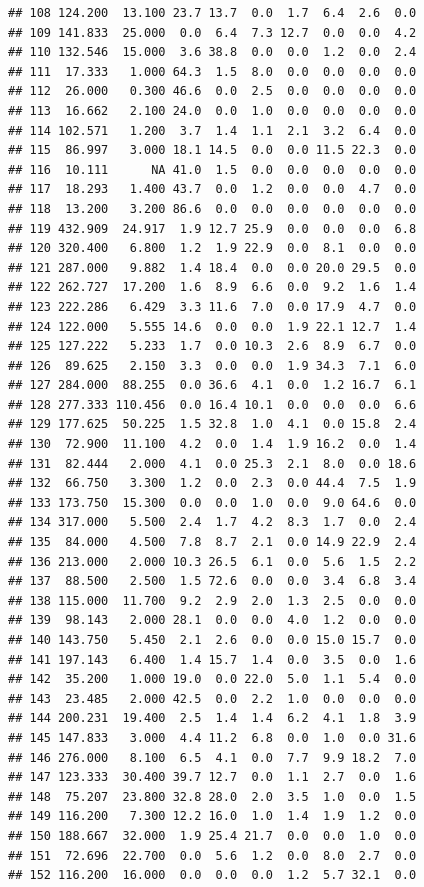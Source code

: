 \documentclass[]{report}
\begin{document}
\begin{verbatim}
## 108 124.200  13.100 23.7 13.7  0.0  1.7  6.4  2.6  0.0
## 109 141.833  25.000  0.0  6.4  7.3 12.7  0.0  0.0  4.2
## 110 132.546  15.000  3.6 38.8  0.0  0.0  1.2  0.0  2.4
## 111  17.333   1.000 64.3  1.5  8.0  0.0  0.0  0.0  0.0
## 112  26.000   0.300 46.6  0.0  2.5  0.0  0.0  0.0  0.0
## 113  16.662   2.100 24.0  0.0  1.0  0.0  0.0  0.0  0.0
## 114 102.571   1.200  3.7  1.4  1.1  2.1  3.2  6.4  0.0
## 115  86.997   3.000 18.1 14.5  0.0  0.0 11.5 22.3  0.0
## 116  10.111      NA 41.0  1.5  0.0  0.0  0.0  0.0  0.0
## 117  18.293   1.400 43.7  0.0  1.2  0.0  0.0  4.7  0.0
## 118  13.200   3.200 86.6  0.0  0.0  0.0  0.0  0.0  0.0
## 119 432.909  24.917  1.9 12.7 25.9  0.0  0.0  0.0  6.8
## 120 320.400   6.800  1.2  1.9 22.9  0.0  8.1  0.0  0.0
## 121 287.000   9.882  1.4 18.4  0.0  0.0 20.0 29.5  0.0
## 122 262.727  17.200  1.6  8.9  6.6  0.0  9.2  1.6  1.4
## 123 222.286   6.429  3.3 11.6  7.0  0.0 17.9  4.7  0.0
## 124 122.000   5.555 14.6  0.0  0.0  1.9 22.1 12.7  1.4
## 125 127.222   5.233  1.7  0.0 10.3  2.6  8.9  6.7  0.0
## 126  89.625   2.150  3.3  0.0  0.0  1.9 34.3  7.1  6.0
## 127 284.000  88.255  0.0 36.6  4.1  0.0  1.2 16.7  6.1
## 128 277.333 110.456  0.0 16.4 10.1  0.0  0.0  0.0  6.6
## 129 177.625  50.225  1.5 32.8  1.0  4.1  0.0 15.8  2.4
## 130  72.900  11.100  4.2  0.0  1.4  1.9 16.2  0.0  1.4
## 131  82.444   2.000  4.1  0.0 25.3  2.1  8.0  0.0 18.6
## 132  66.750   3.300  1.2  0.0  2.3  0.0 44.4  7.5  1.9
## 133 173.750  15.300  0.0  0.0  1.0  0.0  9.0 64.6  0.0
## 134 317.000   5.500  2.4  1.7  4.2  8.3  1.7  0.0  2.4
## 135  84.000   4.500  7.8  8.7  2.1  0.0 14.9 22.9  2.4
## 136 213.000   2.000 10.3 26.5  6.1  0.0  5.6  1.5  2.2
## 137  88.500   2.500  1.5 72.6  0.0  0.0  3.4  6.8  3.4
## 138 115.000  11.700  9.2  2.9  2.0  1.3  2.5  0.0  0.0
## 139  98.143   2.000 28.1  0.0  0.0  4.0  1.2  0.0  0.0
## 140 143.750   5.450  2.1  2.6  0.0  0.0 15.0 15.7  0.0
## 141 197.143   6.400  1.4 15.7  1.4  0.0  3.5  0.0  1.6
## 142  35.200   1.000 19.0  0.0 22.0  5.0  1.1  5.4  0.0
## 143  23.485   2.000 42.5  0.0  2.2  1.0  0.0  0.0  0.0
## 144 200.231  19.400  2.5  1.4  1.4  6.2  4.1  1.8  3.9
## 145 147.833   3.000  4.4 11.2  6.8  0.0  1.0  0.0 31.6
## 146 276.000   8.100  6.5  4.1  0.0  7.7  9.9 18.2  7.0
## 147 123.333  30.400 39.7 12.7  0.0  1.1  2.7  0.0  1.6
## 148  75.207  23.800 32.8 28.0  2.0  3.5  1.0  0.0  1.5
## 149 116.200   7.300 12.2 16.0  1.0  1.4  1.9  1.2  0.0
## 150 188.667  32.000  1.9 25.4 21.7  0.0  0.0  1.0  0.0
## 151  72.696  22.700  0.0  5.6  1.2  0.0  8.0  2.7  0.0
## 152 116.200  16.000  0.0  0.0  0.0  1.2  5.7 32.1  0.0

\end{verbatim}
\end{document}
